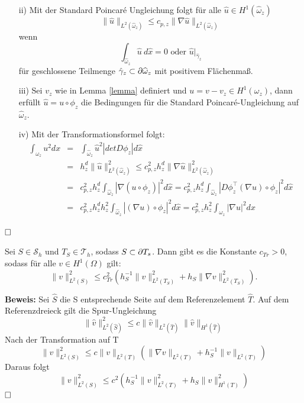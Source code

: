 \begin{itemize}
	\item[ii)] Mit der Standard Poincaré Ungleichung folgt für alle $\widehat{u}\in H^1(\widehat{\omega}_z)$
	\[
	\|\widehat{u}\|_{L^2(\widehat{\omega}_z)} \leq c_{p,z}\|\nabla \widehat{u}\|_{L^2(\widehat{\omega}_z)}
	\]
	wenn \[ \int_{\widehat{\omega}_z}\widehat{u}\:d\hat{x}=0 \text{ oder }\widehat{u}|_{\hat{\gamma}_z}
	\]
	für geschlossene Teilmenge ${\hat{\gamma}_z} \subset \partial \widehat{\omega}_z$ mit positivem Flächenmaß.
	\item[iii)] Sei $v_z$ wie in Lemma \ref{lemma} definiert und $u= v-v_z\in H^1(\omega_z)$, dann erfüllt $\widehat{u} = u \circ \phi_z$ die Bedingungen für die Standard Poincaré-Ungleichung auf $\widehat{\omega}_z$.
	\item[iv)] Mit der Transformationsformel folgt:
	\begin{eqnarray*}
		\int_{\omega_z} u^2dx&=& \int_{\widehat{\omega}_z} \widehat{u}^2 | detD\phi_z|d\hat{x} \\
		&=& h_z^d\|\widehat{u}\|^2_{L^2(\widehat{\omega}_z)} \leq c^2_{p,z}h^d_z\|\nabla \widehat{u}\|^2_{L^2(\widehat{\omega}_z)} \\
		&=&c^2_{p,z}h^d_z\int_{\widehat{\omega}_z}| \nabla (u\circ\phi_z)|^2 d\hat{x} = c^2_{p,z}h^d_z \int_{\widehat{\omega}_z}|D\phi_z^\top(\nabla u)\circ\phi_z|^2 d\hat{x} \\
		&=& c^2_{p,z}h^d_zh^2_z\int_{\widehat{\omega}_z}|(\nabla u)\circ\phi_z|^2d\hat{x} 
		=c^2_{p,z}h^2_z\int_{\omega_z}|\nabla u|^2dx
	\end{eqnarray*} 
\end{itemize}
$\hfill \Box$

\begin{lemma}
	Sei $S \in  \mathcal{S}_h$ und $T_S \in \mathscr{T}_h$, sodass $S \subset \partial T_s$. Dann
	gibt es die Konstante $c_{Tr} > 0$, sodass für alle $v\in H^1(\Omega)$ gilt:
	\[
	\|v\|^2_{L^2(S)} \leq c^2_{Tr}(h_S^{-1}\|v\|^2_{L^2(T_S)}+h_S\|\nabla v\|^2_{L^2(T_S)}).
	\]
\end{lemma}
\textbf{Beweis:}
Sei $\hat{S}$ die S entsprechende Seite auf dem Referenzelement $\hat{T}$. Auf dem Referenzdreieck gilt die Spur-Ungleichung
\[
\|\hat{v}\|^2_{L^2(\hat{S})} \leq c\|\hat{v}\|_{L^2(\hat{T})}\|\hat{v}\|_{H^1(\hat{T})}
\]
Nach der Transformation auf T
\[
\|v\|^2_{L^2(S)} \leq c\|v\|_{L^2(T)}(\|\nabla v\|_{L^2(T)}+h_S^{-1}\|v\|_{L^2(T)})
\]
Daraus folgt
\[
\|v\|^2_{L^2(S)} \leq c^2(h_S^{-1}\|v\|^2_{L^2(T)}+h_S\|v\|^2_{H^1(T)})
\]
$\hfill \Box$
